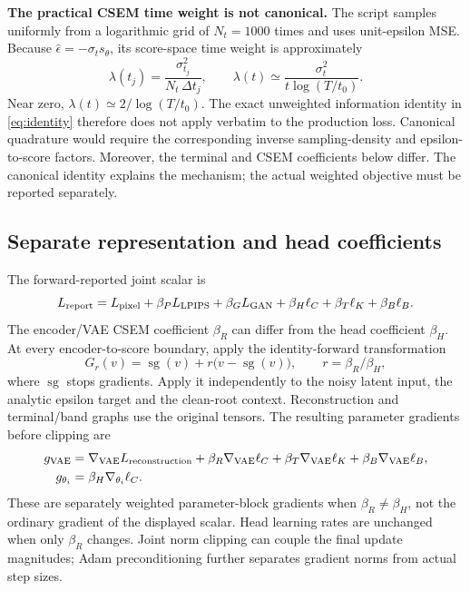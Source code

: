 \documentclass[10pt]{article}
\newcommand{\sg}{\operatorname{sg}}
\begin{document}
\textbf{The practical CSEM time weight is not canonical.} The script samples uniformly from a logarithmic grid of $N_t=1000$ times and uses unit-epsilon MSE. Because $\widehat\epsilon=-\sigma_t s_\theta$, its score-space time weight is approximately
\begin{equation}
\lambda(t_j)=\frac{\sigma_{t_j}^2}{N_t\,\Delta t_j},\qquad
\lambda(t)\simeq\frac{\sigma_t^2}{t\log(T/t_0)}.
\label{eq:lambda}
\end{equation}
Near zero, $\lambda(t)\simeq2/\log(T/t_0)$. The exact unweighted information identity in \eqref{eq:identity} therefore does not apply verbatim to the production loss. Canonical quadrature would require the corresponding inverse sampling-density and epsilon-to-score factors. Moreover, the terminal and CSEM coefficients below differ. The canonical identity explains the mechanism; the actual weighted objective must be reported separately.

\subsection{Separate representation and head coefficients}
The forward-reported joint scalar is
\begin{equation}
L_{\rm report}=L_{\rm pixel}+\beta_P L_{\rm LPIPS}+\beta_G L_{\rm GAN}
+\beta_H\ell_C+\beta_T\ell_K+\beta_B\ell_B.
\end{equation}
The encoder/VAE CSEM coefficient $\beta_R$ can differ from the head coefficient $\beta_H$. At every encoder-to-score boundary, apply the identity-forward transformation
\begin{equation}
G_r(v)=\sg(v)+r\bigl(v-\sg(v)\bigr),\qquad r=\beta_R/\beta_H,
\label{eq:gradientscale}
\end{equation}
where $\sg$ stops gradients. Apply it independently to the noisy latent input, the analytic epsilon target and the clean-root context. Reconstruction and terminal/band graphs use the original tensors. The resulting parameter gradients before clipping are
\begin{align}
g_{\rm VAE}&=\nabla_{\rm VAE}L_{\rm reconstruction}
+\beta_R\nabla_{\rm VAE}\ell_C+\beta_T\nabla_{\rm VAE}\ell_K+\beta_B\nabla_{\rm VAE}\ell_B,\\
g_{\theta_i}&=\beta_H\nabla_{\theta_i}\ell_C.
\end{align}
These are separately weighted parameter-block gradients when $\beta_R\ne\beta_H$, not the ordinary gradient of the displayed scalar. Head learning rates are unchanged when only $\beta_R$ changes. Joint norm clipping can couple the final update magnitudes; Adam preconditioning further separates gradient norms from actual step sizes.
\end{document}
